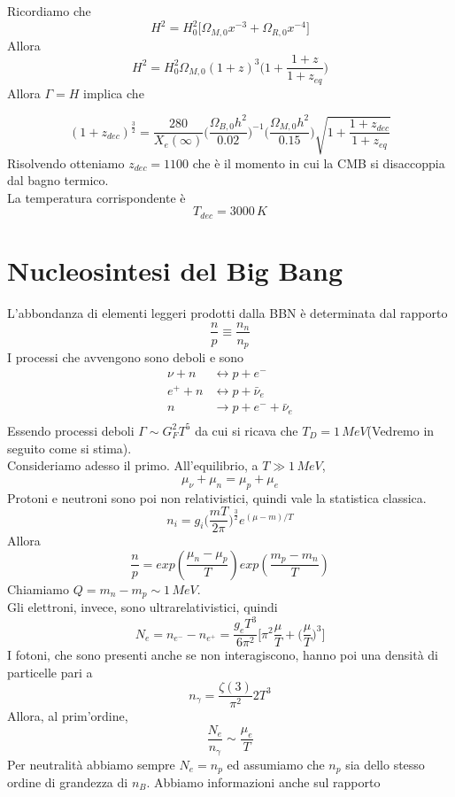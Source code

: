 \documentclass[10pt,a4paper]{article}
\let\oldmarginpar\marginpar
\renewcommand\marginpar[1]{\-\oldmarginpar[\raggedleft\footnotesize #1]%
	{\raggedright\footnotesize #1}}
\theoremstyle{break}
\theoremstyle{remark}
\theoremstyle{definition}
\newcommand{\ra}{\Rightarrow}
\begin{document}
Ricordiamo che
\[
H^2 = H_0^2 \bigg[\Omega_{M, 0}x^{-3} + \Omega_{R, 0}x^{-4} \bigg]
\]
Allora
\marginpar{$$x_0 = 1 \ra x = \frac{1}{1 + z},$$ \\ $$ \Omega_{R, 0} = x_{eq} \Omega_{M, 0}$$}
\[
H^2 = H_0^2 \Omega_{M, 0}(1 + z)^3 \bigg(1 + \frac{1 + z}{1 + z_{eq}} \bigg)
\]
Allora $\Gamma = H$ implica che

\[
(1 + z_{dec})^\frac32 = \frac{280}{X_e(\infty)} \bigg(\frac{\Omega_{B, 0} h^2}{0.02}\bigg)^{-1} \bigg(\frac{\Omega_{M, 0} h^2}{0.15}\bigg)\sqrt{1 + \frac{1 + z_{dec}}{1 + z_{eq}}}
\]
\marginpar{$X_e(\infty) = 7 \cdot 10^{-3}$ da Saha}
Risolvendo otteniamo $z_{dec} = 1100$ che è il momento in cui la CMB si disaccoppia dal bagno termico.\\
La temperatura corrispondente è
\[
T_{dec} = 3000 \, K
\]
\section{Nucleosintesi del Big Bang}
L'abbondanza di elementi leggeri prodotti dalla BBN è determinata dal rapporto
\[
\frac{n}{p} \equiv \frac{n_n}{n_p}
\]
I processi che avvengono sono deboli e sono 
\begin{align*}
\nu + n &\longleftrightarrow p + e^- \\
e^+ + n &\longleftrightarrow p + \bar{\nu}_e \\
n &\longrightarrow p + e^- + \bar{\nu}_e \\
\end{align*}
Essendo processi deboli $\Gamma \sim G_F^2 T^5$ da cui si ricava che $T_D = 1\, MeV$(Vedremo in seguito come si stima). \\
Consideriamo adesso il primo. All'equilibrio, a $T \gg 1\, MeV$, 
\[
\mu_\nu + \mu_n = \mu_p + \mu_e
\]
Protoni e neutroni sono poi non relativistici, quindi vale la statistica classica.
\[
n_i = g_i \bigg(\frac{m T}{2 \pi}\bigg)^\frac32 e^{(\mu - m)/T}
\]
Allora
\[
\frac{n}{p} = exp(\frac{\mu_n - \mu_p}{T})exp(\frac{m_p - m_n}{T})
\]
Chiamiamo $Q = m_n - m_p \sim 1\, MeV$.\\
Gli elettroni, invece, sono ultrarelativistici, quindi
\[
N_e = n_{e^-} - n_{e^+} = \frac{g_e T^3}{6 \pi^2} \bigg[\pi^2 \frac{\mu}{T} + \bigg(\frac{\mu}{T}\bigg)^3 \bigg]
\]
I fotoni, che sono presenti anche se non interagiscono, hanno poi una densità di particelle pari a 
\[
n_\gamma = \frac{\zeta(3)}{\pi^2}2 T^3
\]
Allora, al prim'ordine,
\[
\frac{N_e}{n_\gamma} \sim \frac{\mu_e}{T}
\]
Per neutralità abbiamo sempre $N_e = n_p$ ed assumiamo che $n_p$ sia dello stesso ordine di grandezza di $n_B$. Abbiamo informazioni anche sul rapporto
\end{document}

